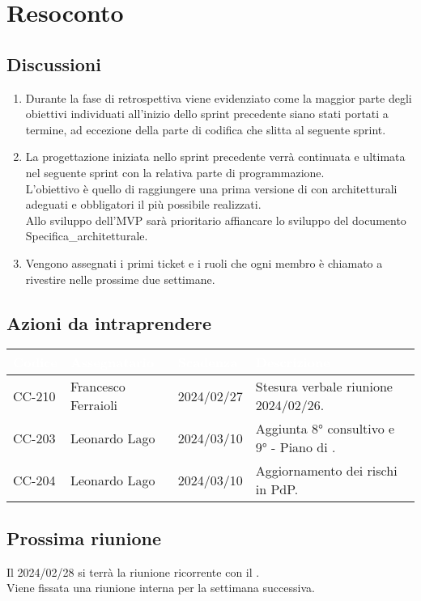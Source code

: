 \section{Resoconto} \label{sec:resoconto}
\subsection{Discussioni} \label{subsec:resdiscussione}
\begin{enumerate}
    \item Durante la fase di retrospettiva viene evidenziato come la maggior parte degli obiettivi individuati all'inizio dello sprint precedente siano stati portati a termine, ad eccezione della parte di codifica che slitta al seguente sprint. 
    
    \item La progettazione iniziata nello sprint precedente verrà continuata e ultimata nel seguente sprint con la relativa parte di programmazione. \\
    L'obiettivo è quello di raggiungere una prima versione di  con  architetturali adeguati e  obbligatori il più possibile realizzati. \\
    Allo sviluppo dell'MVP sarà prioritario affiancare lo sviluppo del documento Specifica\_architetturale.
    
    \item Vengono assegnati i primi ticket e i ruoli che ogni membro è chiamato a rivestire nelle prossime due settimane.
\end{enumerate}

\subsection{Azioni da intraprendere}
{
    \setlength{\tabcolsep}{10pt}
            \renewcommand{\arraystretch}{1.5}
            \begin{xltabular}{\textwidth}{| l | l | l | X |}
                 \hline
                 \textbf{\textcolor{white}{Codice }} & \textbf{\textcolor{white}{Assegnatario}} & \textbf{\textcolor{white}{Scadenza}} & \textbf{\textcolor{white}{Descrizione}} \\
                 \hline
                 CC-210 & Francesco Ferraioli & 2024/02/27 & Stesura verbale riunione 2024/02/26.\\
                 \hline
                 CC-203 & Leonardo Lago & 2024/03/10 & Aggiunta 8° consultivo e 9°  - Piano di .\\
                 \hline
                 CC-204 & Leonardo Lago & 2024/03/10 & Aggiornamento dei rischi in PdP.\\
                 \hline
                 
            \end{xltabular}
}

\subsection{Prossima riunione} \label{subsec:riunione}
Il 2024/02/28 si terrà la riunione ricorrente con il . \\ 
Viene fissata una riunione interna per la settimana successiva.
